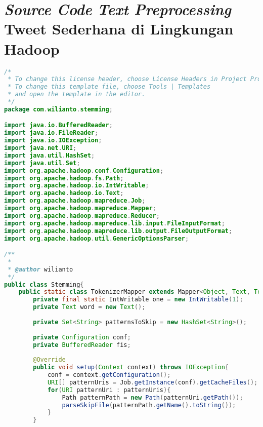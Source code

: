 \chapter{\textit{Source Code} \textit{Text Preprocessing} Tweet Sederhana di Lingkungan Hadoop}
\label{app:C}

\singlespacing 
%
%
\begin{lstlisting}[language=Java,basicstyle=\tiny,caption=Stemming.java]
/*
 * To change this license header, choose License Headers in Project Properties.
 * To change this template file, choose Tools | Templates
 * and open the template in the editor.
 */
package com.wilianto.stemming;

import java.io.BufferedReader;
import java.io.FileReader;
import java.io.IOException;
import java.net.URI;
import java.util.HashSet;
import java.util.Set;
import org.apache.hadoop.conf.Configuration;
import org.apache.hadoop.fs.Path;
import org.apache.hadoop.io.IntWritable;
import org.apache.hadoop.io.Text;
import org.apache.hadoop.mapreduce.Job;
import org.apache.hadoop.mapreduce.Mapper;
import org.apache.hadoop.mapreduce.Reducer;
import org.apache.hadoop.mapreduce.lib.input.FileInputFormat;
import org.apache.hadoop.mapreduce.lib.output.FileOutputFormat;
import org.apache.hadoop.util.GenericOptionsParser;

/**
 *
 * @author wilianto
 */
public class Stemming{
    public static class TokenizerMapper extends Mapper<Object, Text, Text, IntWritable>{
        private final static IntWritable one = new IntWritable(1);
        private Text word = new Text();
        
        private Set<String> patternsToSkip = new HashSet<String>();
        
        private Configuration conf;
        private BufferedReader fis;
        
        @Override
        public void setup(Context context) throws IOException{
            conf = context.getConfiguration();
            URI[] patternUris = Job.getInstance(conf).getCacheFiles();
            for(URI patternUri : patternUris){
                Path patternPath = new Path(patternUri.getPath());
                parseSkipFile(patternPath.getName().toString());
            }
        }
        

\end{lstlisting}
